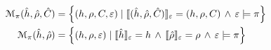 {\small \begin{align}
\mathcal{M}_{\pi}(\hat{h}, \hat\rho, \hat{C}) & = \left\{ (h, \rho, C, \varepsilon) \mid \llbracket (\hat{h}, \hat\rho, \hat{C}) \rrbracket_{\varepsilon} = (h, \rho, C) \, \wedge \,  \varepsilon \models \pi  \right\} \\
\mathcal{M}_{\pi}(\hat{h}, \hat\rho) & = \left\{ (h, \rho, \varepsilon) \mid \llbracket \hat{h} \rrbracket_{\varepsilon} = h \, \wedge \, \llbracket \hat\rho \rrbracket_{\varepsilon} = \rho \, \wedge \,  \varepsilon \models \pi  \right\}
\end{align}}

%


